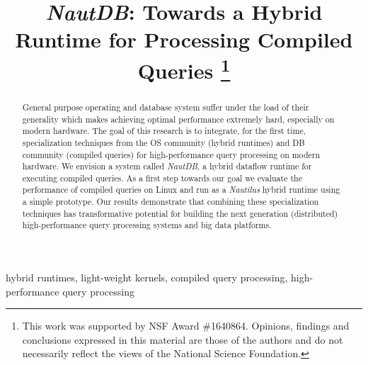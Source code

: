 \documentclass[conference]{IEEEtran}
\begin{document}
\title{\emph{NautDB}: Towards a Hybrid Runtime for Processing Compiled Queries
\thanks{This work was supported by NSF Award \#1640864. Opinions, findings and conclusions expressed in this material are those of the authors and do not necessarily reflect the views of the National Science Foundation.}
}

\author{
}

\newcommand{\todo}[1]{\textcolor{red}{#1}}

\maketitle

\begin{abstract}
General purpose operating and database system suffer under the load of their generality which makes achieving optimal performance extremely hard, especially on modern hardware.
The goal of this research is to integrate, for the first time, specialization techniques from the OS community (hybrid runtimes) and DB community (compiled queries) for high-performance query processing on modern hardware. We envision a system called \emph{NautDB}, a hybrid dataflow runtime for executing compiled queries. As a first step towards our goal we evaluate the performance of compiled queries on Linux and run as a \emph{Nautilus} hybrid runtime using a simple prototype.
Our results demonstrate that combining these specialization techniques has transformative potential for building the next generation (distributed) high-performance query processing systems and big data platforms.
\end{abstract}

\begin{IEEEkeywords}
hybrid runtimes, light-weight kernels, compiled query processing, high-performance query processing
\end{IEEEkeywords}
\end{document}
